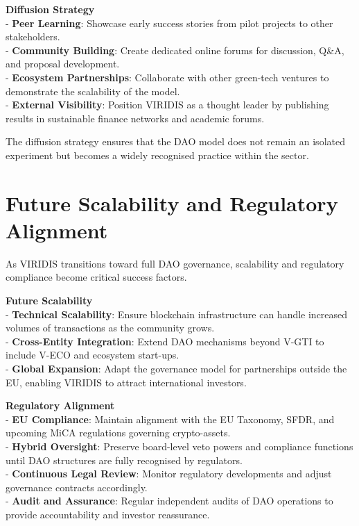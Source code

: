 \documentclass[
  english,
  12pt,
  oneside,
  open=any]{scrbook}
\begin{document}
\textbf{Diffusion Strategy}\\
- \textbf{Peer Learning}: Showcase early success stories from pilot
projects to other stakeholders.\\
- \textbf{Community Building}: Create dedicated online forums for
discussion, Q\&A, and proposal development.\\
- \textbf{Ecosystem Partnerships}: Collaborate with other green-tech
ventures to demonstrate the scalability of the model.\\
- \textbf{External Visibility}: Position VIRIDIS as a thought leader by
publishing results in sustainable finance networks and academic forums.

The diffusion strategy ensures that the DAO model does not remain an
isolated experiment but becomes a widely recognised practice within the
sector.

\section{Future Scalability and Regulatory
Alignment}\label{sec-scalability}

As VIRIDIS transitions toward full DAO governance, scalability and
regulatory compliance become critical success factors.

\textbf{Future Scalability}\\
- \textbf{Technical Scalability}: Ensure blockchain infrastructure can
handle increased volumes of transactions as the community grows.\\
- \textbf{Cross-Entity Integration}: Extend DAO mechanisms beyond V-GTI
to include V-ECO and ecosystem start-ups.\\
- \textbf{Global Expansion}: Adapt the governance model for partnerships
outside the EU, enabling VIRIDIS to attract international investors.

\textbf{Regulatory Alignment}\\
- \textbf{EU Compliance}: Maintain alignment with the EU Taxonomy, SFDR,
and upcoming MiCA regulations governing crypto-assets.\\
- \textbf{Hybrid Oversight}: Preserve board-level veto powers and
compliance functions until DAO structures are fully recognised by
regulators.\\
- \textbf{Continuous Legal Review}: Monitor regulatory developments and
adjust governance contracts accordingly.\\
- \textbf{Audit and Assurance}: Regular independent audits of DAO
operations to provide accountability and investor reassurance.
\end{document}
